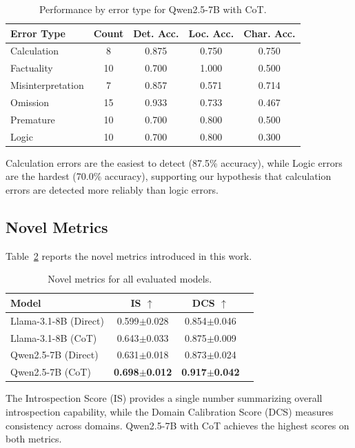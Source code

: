 \documentclass{article}
\begin{document}
\begin{table}[t]
\caption{Performance by error type for Qwen2.5-7B with CoT.}
\label{tab:error_type}
\centering
\begin{tabular}{lcccc}
\toprule
\textbf{Error Type} & \textbf{Count} & \textbf{Det. Acc.} & \textbf{Loc. Acc.} & \textbf{Char. Acc.} \\
\midrule
Calculation & 8 & 0.875 & 0.750 & 0.750 \\
Factuality & 10 & 0.700 & 1.000 & 0.500 \\
Misinterpretation & 7 & 0.857 & 0.571 & 0.714 \\
Omission & 15 & 0.933 & 0.733 & 0.467 \\
Premature & 10 & 0.700 & 0.800 & 0.500 \\
Logic & 10 & 0.700 & 0.800 & 0.300 \\
\bottomrule
\end{tabular}
\end{table}

Calculation errors are the easiest to detect (87.5\% accuracy), while Logic errors are the hardest (70.0\% accuracy), supporting our hypothesis that calculation errors are detected more reliably than logic errors.

\subsection{Novel Metrics}

Table~\ref{tab:novel_metrics} reports the novel metrics introduced in this work.

\begin{table}[t]
\caption{Novel metrics for all evaluated models.}
\label{tab:novel_metrics}
\centering
\begin{tabular}{lccc}
\toprule
\textbf{Model} & \textbf{IS $\uparrow$} & \textbf{DCS $\uparrow$} \\
\midrule
Llama-3.1-8B (Direct) & 0.599$\pm$0.028 & 0.854$\pm$0.046 \\
Llama-3.1-8B (CoT) & 0.643$\pm$0.033 & 0.875$\pm$0.009 \\
Qwen2.5-7B (Direct) & 0.631$\pm$0.018 & 0.873$\pm$0.024 \\
Qwen2.5-7B (CoT) & \textbf{0.698$\pm$0.012} & \textbf{0.917$\pm$0.042} \\
\bottomrule
\end{tabular}
\end{table}

The Introspection Score (IS) provides a single number summarizing overall introspection capability, while the Domain Calibration Score (DCS) measures consistency across domains. Qwen2.5-7B with CoT achieves the highest scores on both metrics.
\end{document}
